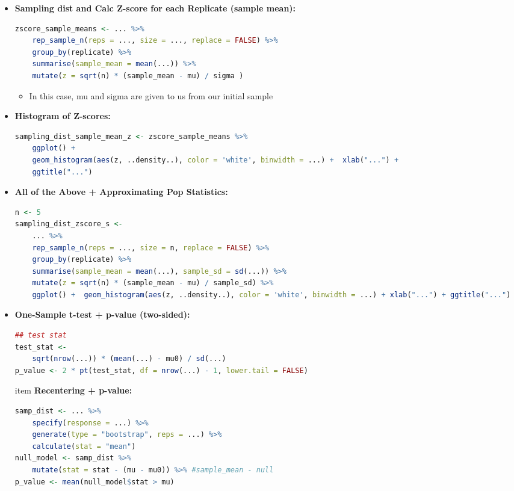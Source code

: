 \documentclass[8pt,landscape,a4paper, fleqn, dvipsnames]{extarticle}
\begin{document}
\begin{multicols*}{4}
\begin{itemize}
\begin{itemize}
\begin{lstlisting}[language = R]
        \end{lstlisting}
    \item \textbf{Sampling dist and Calc Z-score for each Replicate (sample mean):}
        \begin{lstlisting}[language = R]
zscore_sample_means <- ... %>% 
    rep_sample_n(reps = ..., size = ..., replace = FALSE) %>% 
    group_by(replicate) %>% 
    summarise(sample_mean = mean(...)) %>% 
    mutate(z = sqrt(n) * (sample_mean - mu) / sigma )
        \end{lstlisting}
        \begin{itemize}
            \item In this case, mu and sigma are given to us from our initial sample
        \end{itemize}
    \item \textbf{Histogram of Z-scores:}
        \begin{lstlisting}[language = R]
sampling_dist_sample_mean_z <- zscore_sample_means %>% 
    ggplot() + 
    geom_histogram(aes(z, ..density..), color = 'white', binwidth = ...) +  xlab("...") +
    ggtitle("...")
        \end{lstlisting}
    \item \textbf{All of the Above + Approximating Pop Statistics:}
        \begin{lstlisting}[language = R]
n <- 5
sampling_dist_zscore_s <-
    ... %>% 
    rep_sample_n(reps = ..., size = n, replace = FALSE) %>% 
    group_by(replicate) %>% 
    summarise(sample_mean = mean(...), sample_sd = sd(...)) %>% 
    mutate(z = sqrt(n) * (sample_mean - mu) / sample_sd) %>% 
    ggplot() +  geom_histogram(aes(z, ..density..), color = 'white', binwidth = ...) + xlab("...") + ggtitle("...")
        \end{lstlisting}
    \item \textbf{One-Sample t-test + p-value (two-sided):}
        \begin{lstlisting}[language = R]
## test stat
test_stat <- 
    sqrt(nrow(...)) * (mean(...) - mu0) / sd(...)
p_value <- 2 * pt(test_stat, df = nrow(...) - 1, lower.tail = FALSE)
        \end{lstlisting}
        item \textbf{Recentering + p-value:}
        \begin{lstlisting}[language = R]
samp_dist <- ... %>%
    specify(response = ...) %>%
    generate(type = "bootstrap", reps = ...) %>%
    calculate(stat = "mean")
null_model <- samp_dist %>%
    mutate(stat = stat - (mu - mu0)) %>% #sample_mean - null
p_value <- mean(null_model$stat > mu)

\end{lstlisting}
\end{itemize}
\end{itemize}
\end{multicols*}
\end{document}
